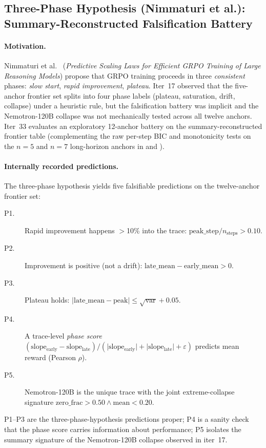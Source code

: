 \subsection{Three-Phase Hypothesis (Nimmaturi et al.): Summary-Reconstructed Falsification Battery}
\label{sec:scaling-law-iter33}

\paragraph{Motivation.}
Nimmaturi et al.~\citep{nimmaturi2025predictive}
(\emph{Predictive Scaling Laws for Efficient GRPO Training of Large
Reasoning Models}) propose that GRPO training proceeds in three
\emph{consistent} phases: \emph{slow start}, \emph{rapid improvement},
\emph{plateau}. Iter~17 observed that the five-anchor frontier set
splits into four phase labels (plateau, saturation, drift, collapse)
under a heuristic rule, but the falsification battery was implicit and
the Nemotron-120B collapse was not mechanically tested across all
twelve anchors. Iter~33 evaluates an exploratory 12-anchor battery on
the summary-reconstructed frontier table (complementing the raw
per-step BIC and monotonicity tests on the $n=5$ and $n=7$ long-horizon
anchors in  and ).

\paragraph{Internally recorded predictions.}
The three-phase hypothesis yields five falsifiable predictions on the
twelve-anchor frontier set:
\begin{description}
\item[P1.] Rapid improvement happens $>$10\% into the trace:
  $\mathrm{peak\_step}/n_{\mathrm{steps}} > 0.10$.
\item[P2.] Improvement is positive (not a drift):
  $\mathrm{late\_mean} - \mathrm{early\_mean} > 0$.
\item[P3.] Plateau holds: $\lvert \mathrm{late\_mean} - \mathrm{peak} \rvert
  \le \sqrt{\mathrm{var}} + 0.05$.
\item[P4.] A trace-level \emph{phase score}
  $(\mathrm{slope_{early}} - \mathrm{slope_{late}}) /
  (\lvert\mathrm{slope_{early}}\rvert + \lvert\mathrm{slope_{late}}\rvert
  + \varepsilon)$ predicts mean reward (Pearson $\rho$).
\item[P5.] Nemotron-120B is the unique trace with the joint
  extreme-collapse signature
  $\mathrm{zero\_frac} > 0.50 \wedge \mathrm{mean} < 0.20$.
\end{description}
P1--P3 are the three-phase-hypothesis predictions proper; P4 is a
sanity check that the phase score carries information about
performance; P5 isolates the summary signature of the Nemotron-120B
collapse observed in iter~17.


